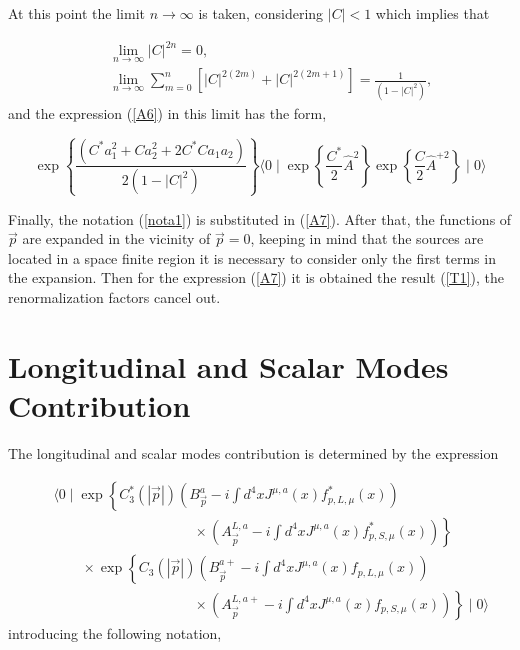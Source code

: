 \documentclass[12pt,letterpaper]{report}
\begin{document}
At this point the limit $n\rightarrow \infty$ is taken,
considering $\left| C\right| <1$ which implies that

\begin{eqnarray}
&&\lim_{n\rightarrow \infty }\left| C\right| ^{2n}=0, \nonumber
\\ &&\lim_{n\rightarrow \infty }\sum\limits_{m=0}^n\left[ \left|
C\right| ^{2\left(2m\right) }+\left| C\right| ^{2\left(
2m+1\right) }\right] =\frac 1{\left(1-\left| C\right| ^2\right) },
\label{lim}
\end{eqnarray}
and the expression (\ref{A6}) in this limit has the form,

\begin{equation}
\exp \left\{ \frac{\left(C^{*}a_{1}^2+Ca_2^2+2C^{*}Ca_1a_2\right)
}{2\left(1-\left| C\right| ^2\right) }\right\} \langle 0\mid \exp
\left\{ \frac{C^{*}} 2\hat{A}^2\right\} \exp \left\{ \frac
C2\hat{A}^{+2}\right\} \mid 0\rangle \label{A7}
\end{equation}

Finally, the notation (\ref{nota1}) is substituted in (\ref{A7}).
After that, the functions of $\vec{p}$ are expanded in the
vicinity of $\vec{p}=0$, keeping in mind that the sources are
located in a space finite region it is necessary to consider only
the first terms in the expansion. Then for the expression
(\ref{A7}) it is obtained the result (\ref{T1}), the
renormalization factors cancel out.

\chapter{Longitudinal and Scalar Modes Contribution}

The longitudinal and scalar modes contribution is determined by
the expression

\begin{eqnarray}
&&\langle 0\mid \exp \left\{ C_3^{*}\left(\left| \vec{p}\right|
\right) \left(B_{\vec{p}}^a-i\int d^4xJ^{\mu,a}\left(x\right)
f_{p,L,\mu }^{*}\left(x\right) \right) \right. \nonumber \\
&&\qquad\qquad\qquad\qquad\qquad \times \left. \left(
A_{\vec{p}}^{L,a}-i\int d^4xJ^{\mu,a}\left(x\right) f_{p,S,\mu
}^{*}\left(x\right) \right) \right\} \nonumber \\ &&\qquad \times
\exp \left\{ C_3\left(\left| \vec{p}\right| \right) \left(B_{
\vec{p}}^{a+}-i\int d^4xJ^{\mu,a}\left(x\right) f_{p,L,\mu
}\left(x\right) \right) \right. \nonumber \\
&&\qquad\qquad\qquad\qquad\qquad \times \left. \left(
A_{\vec{p}}^{L,a+}-i\int d^4xJ^{\mu,a}\left(x\right) f_{p,S,\mu
}\left(x\right) \right) \right\} \mid 0\rangle \label{B1}
\end{eqnarray}
introducing the following notation,
\end{document}

